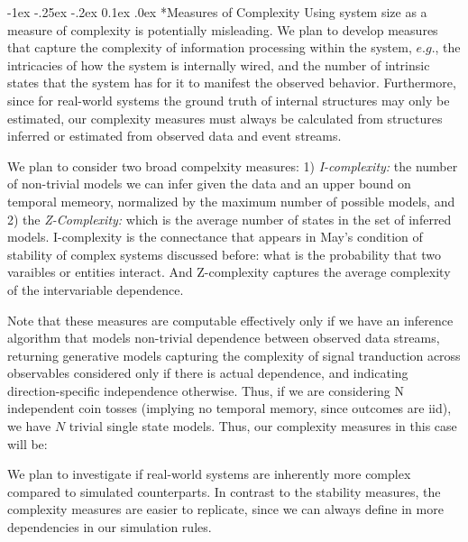 \documentclass[onecolumn, compsoc,11pt]{IEEEtran}
\makeatletter
\renewcommand\subsection{\@startsection {section}{1}{\z@}%
  {-1ex \@plus -.25ex \@minus -.2ex}%
  {0.1ex \@plus.0ex}%
  {\fontsize{11}{10}\selectfont\bfseries\sffamily\color{DodgerBlue4}}}
\makeatother
\begin{document}
\subsection*{Measures of Complexity}
Using system  size as a measure of complexity is potentially misleading. We plan to develop measures that capture the complexity of information processing within the system, $e.g.$, the intricacies of how the system is internally wired, and the number of intrinsic states that the system has for it to manifest the observed behavior. Furthermore, since for real-world systems the ground truth of internal structures may only be estimated, our complexity measures must always be calculated from structures inferred or estimated from observed data and event streams.

We plan to consider two broad compelxity measures: 1) \textit{I-complexity:}  the number of non-trivial models we can infer given the data and an upper bound on temporal memeory, normalized by the maximum number of possible models,   and 2) the \textit{Z-Complexity:} which is the average number of states in the set of inferred models.
I-complexity  is the connectance that appears in May's condition of stability of complex systems discussed before: what is the probability that two varaibles or entities interact. And Z-complexity captures the average complexity of the intervariable dependence. 

Note that these measures are computable effectively only if we have an inference algorithm that models non-trivial dependence between observed data streams, returning generative models capturing the complexity of signal tranduction across observables considered only if there is actual dependence, and indicating  direction-specific independence otherwise. Thus, if we are considering N independent coin tosses (implying no temporal memory, since outcomes are iid), we have $N$ trivial single state models. Thus, our complexity measures in this case will be: 

We plan to investigate if real-world systems are inherently more complex compared to simulated counterparts. In contrast to the stability measures, the complexity measures are easier to replicate, since we can always define in more dependencies in our simulation rules.

\end{document}
